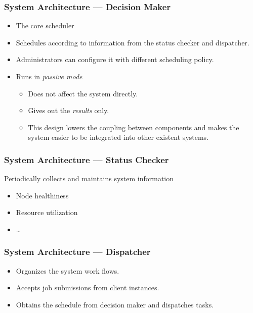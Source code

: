 \begin{frame}
  \frametitle{System Architecture --- Decision Maker}
  \begin{itemize}
    \item The core scheduler
    \item Schedules according to information from the status checker and
      dispatcher.
    \item Administrators can configure it with different scheduling
      policy.
    \item Runs in \emph{passive mode}
      \begin{itemize}
        \item Does not affect the system directly.
        \item Gives out the \emph{results} only.
        \item This design lowers the coupling between components and
          makes the system easier to be integrated into other existent
          systems.
      \end{itemize}
  \end{itemize}
\end{frame}
\begin{frame}
  \frametitle{System Architecture --- Status Checker}
  Periodically collects and maintains system information
  \begin{itemize}
    \item Node healthiness
    \item Resource utilization
    \item \ldots
  \end{itemize}
\end{frame}
\begin{frame}
  \frametitle{System Architecture --- Dispatcher}
  \begin{itemize}
    \item Organizes the system work flows.
    \item Accepts job submissions from client instances.
    \item Obtains the schedule from decision maker and dispatches
      tasks.
  \end{itemize}
\end{frame}
